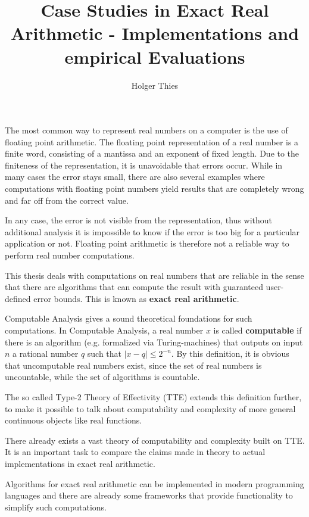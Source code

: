 \documentclass[]{article}
\title{Case Studies in Exact Real Arithmetic - Implementations and empirical
Evaluations}
\author{Holger Thies}
\date{}
\newcommand{\abs}[1]{\left|#1\right|}
\begin{document}
\maketitle
The most common way to represent real numbers on a computer is the use of floating point
arithmetic.
The floating point representation of a real number is a finite word, consisting
of a mantissa and an exponent of fixed length.
Due to the finiteness of the representation, it is unavoidable that errors
occur.
While in many cases the error stays small, there are also several examples
where computations with floating point numbers yield results that are
completely wrong and far off from the correct value.

In any case, the error is not visible from the representation, thus without
additional analysis it is impossible to know if the error is too big for a
particular application or not.
Floating point arithmetic is therefore not a reliable way to perform real number
computations.

This thesis deals with computations on real numbers that are reliable in the
sense that there are algorithms that can compute the result with guaranteed
user-defined error bounds.
This is known as \textbf{exact real arithmetic}.

Computable Analysis gives a sound theoretical foundations for such
computations.
In Computable Analysis, a real number $x$ is called \textbf{computable} if there is
an algorithm (e.g. formalized via Turing-machines) that outputs on input $n$ a rational number $q$ such that
$\abs{x-q} \leq 2^{-n}$. 
By this definition, it is obvious that uncomputable real numbers exist, since
the set of real numbers is uncountable, while the set of algorithms is
countable.

The so called Type-2 Theory of Effectivity (TTE) extends this definition
further, to make it possible to talk about computability and complexity of more
general continuous objects like real functions.

There already exists a vast theory of computability and complexity built on
TTE.
It is an important task to compare the claims made in theory to actual
implementations in exact real arithmetic.

Algorithms for exact real arithmetic can be implemented in modern programming
languages and there are already some frameworks that provide functionality to
simplify such computations.
\end{document}

